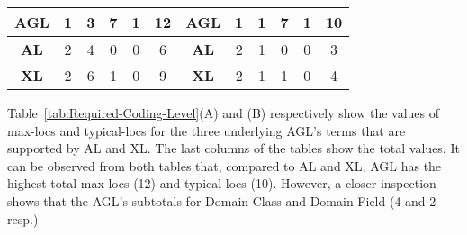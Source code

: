 \begin{table}[]
\begin{tabular}{|c|cccc|c|cccc|c|c|}
	\textbf{AGL} & \multicolumn{1}{c|}{1}                                                       & \multicolumn{1}{c|}{3}                                                      & \multicolumn{1}{c|}{7}                                                            & 1                                                                  & 12                      & \multicolumn{1}{c|}{\textbf{AGL}} & \multicolumn{1}{c|}{1}                                                       & \multicolumn{1}{c|}{1}                                                       & 7                                                            & 1                                                                  & 10                      \\ \hline
	\textbf{AL}  & \multicolumn{1}{c|}{2}                                                       & \multicolumn{1}{c|}{4}                                                      & \multicolumn{1}{c|}{0}                                                            & 0                                                                  & 6                       & \multicolumn{1}{c|}{\textbf{AL}}  & \multicolumn{1}{c|}{2}                                                       & \multicolumn{1}{c|}{1}                                                       & 0                                                            & 0                                                                  & 3                       \\ \hline
	\textbf{XL}  & \multicolumn{1}{c|}{2}                                                       & \multicolumn{1}{c|}{6}                                                      & \multicolumn{1}{c|}{1}                                                            & 0                                                                  & 9                       & \multicolumn{1}{c|}{\textbf{XL}}  & \multicolumn{1}{c|}{2}                                                       & \multicolumn{1}{c|}{1}                                                       & 1                                                            & 0                                                                  & 4
	                       \\ \hline
\end{tabular}
\end{table}
%
Table~\ref{tab:Required-Coding-Level}(A) and (B) respectively show the values of max-locs and typical-locs for the three underlying AGL’s terms that are supported by AL and XL. The last columns of the tables show the total values. It can be observed from both tables that, compared to AL and XL, AGL has the highest total max-locs (12) and typical locs (10). However, a closer inspection shows that the AGL’s subtotals for Domain Class and Domain Field (4 and 2 resp.)
